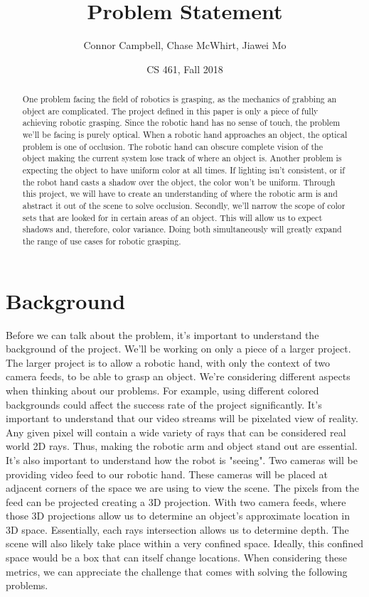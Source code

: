 \documentclass{article}
\title{Problem Statement}
\author{Connor Campbell, Chase McWhirt, Jiawei Mo}
\date{CS 461, Fall 2018}
\begin{document}
\maketitle

\begin{abstract}
One problem facing the field of robotics is grasping, as the mechanics of grabbing an object are complicated.
The project defined in this paper is only a piece of fully achieving robotic grasping.
Since the robotic hand has no sense of touch, the problem we’ll be facing is purely optical.
When a robotic hand approaches an object, the optical problem is one of occlusion.
The robotic hand can obscure complete vision of the object making the current system lose track of where an object is.
Another problem is expecting the object to have uniform color at all times.
If lighting isn’t consistent, or if the robot hand casts a shadow over the object, the color won’t be uniform.
Through this project, we will have to create an understanding of where the robotic arm is and abstract it out of the scene to solve occlusion.
Secondly, we’ll narrow the scope of color sets that are looked for in certain areas of an object.
This will allow us to expect shadows and, therefore, color variance.
Doing both simultaneously will greatly expand the range of use cases for robotic grasping.

\end{abstract}

\newpage

\section{Background}
Before we can talk about the problem, it's important to understand the background of the project.
We'll be working on only a piece of a larger project.
The larger project is to allow a robotic hand, with only the context of two camera feeds, to be able to grasp an object.
We're considering different aspects when thinking about our problems.
For example, using different colored backgrounds could affect the success rate of the project significantly.
It's important to understand that our video streams will be pixelated view of reality.
Any given pixel will contain a wide variety of rays that can be considered real world 2D rays.
Thus, making the robotic arm and object stand out are essential.
It's also important to understand how the robot is "seeing".
Two cameras will be providing video feed to our robotic hand.
These cameras will be placed at adjacent corners of the space we are using to view the scene.
The pixels from the feed can be projected creating a 3D projection.
With two camera feeds, where those 3D projections allow us to determine an object's approximate location in 3D space.
Essentially, each rays intersection allows us to determine depth.
The scene will also likely take place within a very confined space.
Ideally, this confined space would be a box that can itself change locations.
When considering these metrics, we can appreciate the challenge that comes with solving the following problems.
\end{document}
